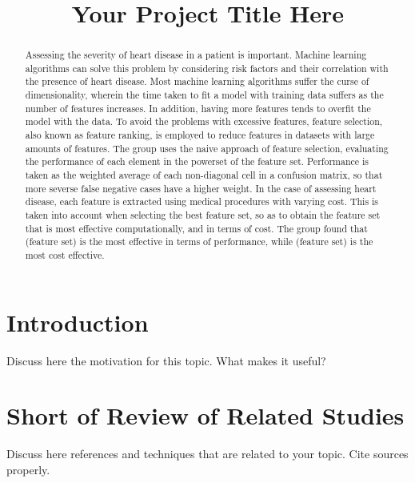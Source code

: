 \documentclass[conference]{IEEEtran}
\begin{document}
\title{Your Project Title Here}

\author{
}

\maketitle

\begin{abstract}
	Assessing the severity of heart disease in a patient is important.
	Machine learning algorithms can solve this problem by considering risk factors and their correlation with the presence of heart disease.
	Most machine learning algorithms suffer the curse of dimensionality, wherein the time taken to fit a model with training data suffers as the number of features increases.
	In addition, having more features tends to overfit the model with the data.
	To avoid the problems with excessive features, feature selection, also known as feature ranking, is employed to reduce features in datasets with large amounts of features.
	The group uses the naive approach of feature selection, evaluating the performance of each element in the powerset of the feature set.
	Performance is taken as the weighted average of each non-diagonal cell in a confusion matrix, so that more severse false negative cases have a higher weight.
	In the case of assessing heart disease, each feature is extracted using medical procedures with varying cost.
	This is taken into account when selecting the best feature set, so as to obtain the feature set that is most effective computationally, and in terms of cost.
	The group found that (feature set) is the most effective in terms of performance, while (feature set) is the most cost effective.
\end{abstract}

\section{Introduction}
Discuss here the motivation for this topic. What makes it useful?
\section{Short of Review of Related Studies}
Discuss here references and techniques that are related to your topic. Cite sources properly.
\end{document}
